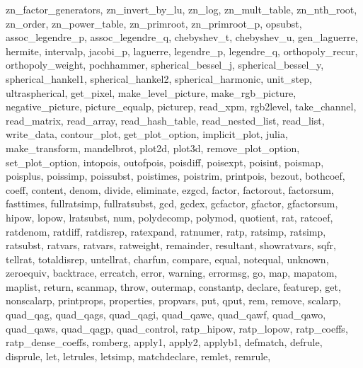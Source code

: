 {{    zn_factor_generators,
    zn_invert_by_lu,
    zn_log,
    zn_mult_table,
    zn_nth_root,
    zn_order,
    zn_power_table,
    zn_primroot,
    zn_primroot_p,
    opsubst,
    assoc_legendre_p,
    assoc_legendre_q,
    chebyshev_t,
    chebyshev_u,
    gen_laguerre,
    hermite,
    intervalp,
    jacobi_p,
    laguerre,
    legendre_p,
    legendre_q,
    orthopoly_recur,
    orthopoly_weight,
    pochhammer,
    spherical_bessel_j,
    spherical_bessel_y,
    spherical_hankel1,
    spherical_hankel2,
    spherical_harmonic,
    unit_step,
    ultraspherical,
    get_pixel,
    make_level_picture,
    make_rgb_picture,
    negative_picture,
    picture_equalp,
    picturep,
    read_xpm,
    rgb2level,
    take_channel,
    read_matrix,
    read_array,
    read_hash_table,
    read_nested_list,
    read_list,
    write_data,
    contour_plot,
    get_plot_option,
    implicit_plot,
    julia,
    make_transform,
    mandelbrot,
    plot2d,
    plot3d,
    remove_plot_option,
    set_plot_option,
    intopois,
    outofpois,
    poisdiff,
    poisexpt,
    poisint,
    poismap,
    poisplus,
    poissimp,
    poissubst,
    poistimes,
    poistrim,
    printpois,
    bezout,
    bothcoef,
    coeff,
    content,
    denom,
    divide,
    eliminate,
    ezgcd,
    factor,
    factorout,
    factorsum,
    fasttimes,
    fullratsimp,
    fullratsubst,
    gcd,
    gcdex,
    gcfactor,
    gfactor,
    gfactorsum,
    hipow,
    lopow,
    lratsubst,
    num,
    polydecomp,
    polymod,
    quotient,
    rat,
    ratcoef,
    ratdenom,
    ratdiff,
    ratdisrep,
    ratexpand,
    ratnumer,
    ratp,
    ratsimp,
    ratsimp,
    ratsubst,
    ratvars,
    ratvars,
    ratweight,
    remainder,
    resultant,
    showratvars,
    sqfr,
    tellrat,
    totaldisrep,
    untellrat,
    charfun,
    compare,
    equal,
    notequal,
    unknown,
    zeroequiv,
    backtrace,
    errcatch,
    error,
    warning,
    errormsg,
    go,
    map,
    mapatom,
    maplist,
    return,
    scanmap,
    throw,
    outermap,
    constantp,
    declare,
    featurep,
    get,
    nonscalarp,
    printprops,
    properties,
    propvars,
    put,
    qput,
    rem,
    remove,
    scalarp,
    quad_qag,
    quad_qags,
    quad_qagi,
    quad_qawc,
    quad_qawf,
    quad_qawo,
    quad_qaws,
    quad_qagp,
    quad_control,
    ratp_hipow,
    ratp_lopow,
    ratp_coeffs,
    ratp_dense_coeffs,
    romberg,
    apply1,
    apply2,
    applyb1,
    defmatch,
    defrule,
    disprule,
    let,
    letrules,
    letsimp,
    matchdeclare,
    remlet,
    remrule,
}}
